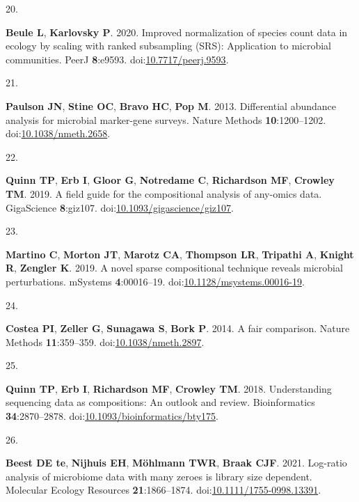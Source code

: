 \documentclass[
]{article}
\newlength{\cslhangindent}
\newlength{\csllabelwidth}
\newlength{\cslentryspacingunit} %
\newenvironment{CSLReferences}[2] %
 {%
  \setlength{\parindent}{0pt}
  \ifodd #1
  \let\oldpar\par
  \def\par{\hangindent=\cslhangindent\oldpar}
  \fi
  \setlength{\parskip}{#2\cslentryspacingunit}
 }%
 {}
\newcommand{\CSLLeftMargin}[1]{\parbox[t]{\csllabelwidth}{#1}}
\newcommand{\CSLRightInline}[1]{\parbox[t]{\linewidth - \csllabelwidth}{#1}\break}
\begin{document}
\begin{CSLReferences}{0}{1}
\leavevmode{}%
\CSLLeftMargin{20. }%
\CSLRightInline{\textbf{Beule L}, \textbf{Karlovsky P}. 2020. Improved
normalization of species count data in ecology by scaling with ranked
subsampling (SRS): Application to microbial communities. PeerJ
\textbf{8}:e9593.
doi:\href{https://doi.org/10.7717/peerj.9593}{10.7717/peerj.9593}.}

\leavevmode{}%
\CSLLeftMargin{21. }%
\CSLRightInline{\textbf{Paulson JN}, \textbf{Stine OC}, \textbf{Bravo
HC}, \textbf{Pop M}. 2013. Differential abundance analysis for microbial
marker-gene surveys. Nature Methods \textbf{10}:1200--1202.
doi:\href{https://doi.org/10.1038/nmeth.2658}{10.1038/nmeth.2658}.}

\leavevmode{}%
\CSLLeftMargin{22. }%
\CSLRightInline{\textbf{Quinn TP}, \textbf{Erb I}, \textbf{Gloor G},
\textbf{Notredame C}, \textbf{Richardson MF}, \textbf{Crowley TM}. 2019.
A field guide for the compositional analysis of any-omics data.
{GigaScience} \textbf{8}:giz107.
doi:\href{https://doi.org/10.1093/gigascience/giz107}{10.1093/gigascience/giz107}.}

\leavevmode{}%
\CSLLeftMargin{23. }%
\CSLRightInline{\textbf{Martino C}, \textbf{Morton JT}, \textbf{Marotz
CA}, \textbf{Thompson LR}, \textbf{Tripathi A}, \textbf{Knight R},
\textbf{Zengler K}. 2019. A novel sparse compositional technique reveals
microbial perturbations. {mSystems} \textbf{4}:00016--19.
doi:\href{https://doi.org/10.1128/msystems.00016-19}{10.1128/msystems.00016-19}.}

\leavevmode{}%
\CSLLeftMargin{24. }%
\CSLRightInline{\textbf{Costea PI}, \textbf{Zeller G}, \textbf{Sunagawa
S}, \textbf{Bork P}. 2014. A fair comparison. Nature Methods
\textbf{11}:359--359.
doi:\href{https://doi.org/10.1038/nmeth.2897}{10.1038/nmeth.2897}.}

\leavevmode{}%
\CSLLeftMargin{25. }%
\CSLRightInline{\textbf{Quinn TP}, \textbf{Erb I}, \textbf{Richardson
MF}, \textbf{Crowley TM}. 2018. Understanding sequencing data as
compositions: An outlook and review. Bioinformatics
\textbf{34}:2870--2878.
doi:\href{https://doi.org/10.1093/bioinformatics/bty175}{10.1093/bioinformatics/bty175}.}

\leavevmode{}%
\CSLLeftMargin{26. }%
\CSLRightInline{\textbf{Beest DE te}, \textbf{Nijhuis EH},
\textbf{Möhlmann TWR}, \textbf{Braak CJF}. 2021. Log-ratio analysis of
microbiome data with many zeroes is library size dependent. Molecular
Ecology Resources \textbf{21}:1866--1874.
doi:\href{https://doi.org/10.1111/1755-0998.13391}{10.1111/1755-0998.13391}.}


\end{CSLReferences}
\end{document}

